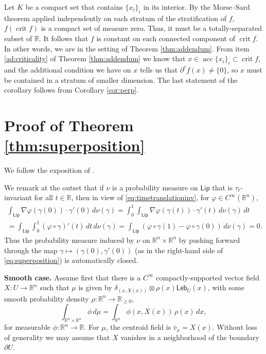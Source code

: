 \documentclass[11pt]{article}
\theoremstyle{definition}
\theoremstyle{remark}
\DeclareMathOperator{\crit}{crit}
\DeclareMathOperator{\acc}{acc}
\newcommand{\R}{\mathbb{R}}
\newcommand{\lebesgue}{\mathsf{Leb}}
\newcommand{\lipschitz}{\mathsf{Lip}}
\renewcommand{\geq}{\geqslant}
\begin{document}
  Let $K$ be a compact set that contains $\{x_i\}_i$ in its interior. By the Morse--Sard theorem applied independently on each stratum of the stratification of $f$, $f(\crit f)$ is a compact set of measure zero. Thus, it must be a totally-separated subset of $\R$. It follows that $f$ is constant on each connected component of $\crit f$. In other words, we are in the setting of Theorem \ref{thm:addendum}. From item \ref{ad:criticality} of Theorem \ref{thm:addendum} we know that $x\in\acc\{x_i\}_i\subset\crit f$, and the additional condition we have on $x$ tells us that $\partial^c f(x)\neq\{0\}$, so $x$ must be contained in a stratum of smaller dimension. The last statement of the corollary follows from Corollary \ref{cor:perp}.
 
 
\appendix

\section{Proof of Theorem \ref{thm:superposition}}
\label{sec:pfsuperposition}

%
%
%
%
%
%
%
%
%

\noindent We follow the exposition of \cite{bangert1999minimal}.

We remark at the outset that if $\nu$ is a probability measure on $\lipschitz$ that is $\tau_t$-invariant for all $t\in\R$, then in view of \eqref{eq:timetranslationinv}, for $\varphi\in C^\infty(\R^n)$,
\begin{multline*}
    \int_{\lipschitz}\nabla \varphi(\gamma(0))\cdot\gamma'(0)\,d\nu(\gamma)=\int_0^1\int_{\lipschitz} \nabla \varphi(\gamma(t))\cdot\gamma'(t)\,d\nu(\gamma)\,dt\\
      =\int_{ \lipschitz} \int_0^1(\varphi\circ\gamma)'(t)\,dt\,d\nu(\gamma)
      =\int_{ \lipschitz} (\varphi\circ\gamma(1)-\varphi\circ\gamma(0))\,d\nu(\gamma)=0.
\end{multline*}
Thus the probability measure induced by $\nu$ on $\R^n\times\R^n$ by pushing forward through the map $\gamma\mapsto (\gamma(0),\gamma'(0))$ (as in the right-hand side of \eqref{eq:superposition}) is automatically closed.
%

\smallskip
\noindent \textbf{Smooth case.}
Assume first that there is a $C^\infty$ compactly-supported vector field $X\colon U\to\R^n$ such that $\mu$ is given by $\delta_{(x,X(x))}\otimes\rho(x)\lebesgue_{U}(x)$, with some smooth probability density $\rho\colon\R^n\to\R_{\geq0}$, 
\[\int_{\R^n\times\R^n}\phi\,d\mu=\int_{\R^n}
\phi(x,X(x))\,\rho(x)\,dx,\]
for measurable $\phi\colon\R^n\to\R$.
For $\mu$, the centroid field is $\bar v_x=X(x)$. Without loss of generality we may assume that $X$ vanishes in a neighborhood of the boundary $\partial U$.
\end{document}
